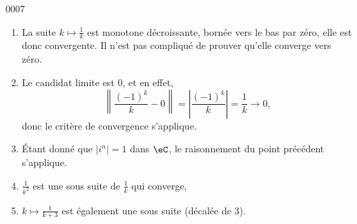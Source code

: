 
\begin{corrige}{0007}

\begin{enumerate}
\item La suite $k\mapsto \frac{1}{ k }$ est monotone décroissante, bornée vers le bas par zéro, elle est donc convergente. Il n'est pas compliqué de prouver qu'elle converge vers zéro.
\item Le candidat limite est $0$, et en effet,
\begin{equation}
	\left\|  \frac{ (-1)^k }{ k }-0 \right\|=\left| \frac{ (-1)^k }{ k }\right|=\frac{1}{ k } \to 0,
\end{equation}
donc le critère de convergence s'applique.
\item Étant donné que $| i^n |=1$ dans $\eC$, le raisonnement du point précédent s'applique.
\item $\frac{1}{ k^2 }$ est une sous suite de $\frac{1}{ k }$ qui converge,
\item $k\mapsto\frac{1}{ k+3 }$ est également une sous suite (décalée de $3$).
\end{enumerate}


\end{corrige}

